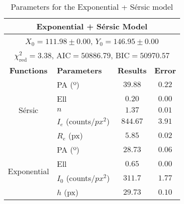 \begin{table}[!htb]
  \centering
  \begin{tabular}{|c|l|c|c|}
    \hline
    \multicolumn{4}{|c|}{\textbf{Exponential + Sérsic Model}}                                                    \\
    \hline
    \multicolumn{4}{|c|}{\(X_{0} = 111.98 \pm 0.00\), \(Y_{0} = 146.95 \pm 0.00\)}                               \\
    \hline
    \multicolumn{4}{|c|}{\(\chi^{2}_{\text{red}} = 3.38\), \(\text{AIC} = 50886.79\), \(\text{BIC} = 50970.57\)} \\
    \hline
    \textbf{Functions} & \textbf{Parameters}           & \textbf{Results} & \textbf{Error}                       \\
    \hline
    \multirow{5}{*}{Sérsic}
                       & PA (º)                        & \(39.88\)        & \(0.22\)                             \\
                       & Ell                           & \(0.20\)         & \(0.00\)                             \\
                       & \(n\)                         & \(1.37\)         & \(0.01\)                             \\
                       & \(I_{e}\) (counts/\(px^{2}\)) & \(844.67\)       & \(3.91\)                             \\
                       & \(R_{e}\) (px)                & \(5.85\)         & \(0.02\)                             \\
    \hline
    \multirow{4}{*}{Exponential}
                       & PA (º)                        & \(28.73\)        & \(0.06\)                             \\
                       & Ell                           & \(0.65\)         & \(0.00\)                             \\
                       & \(I_{0}\) (counts/\(px^{2}\)) & \(311.7\)        & \(1.77\)                             \\
                       & \(h\) (px)                    & \(29.73\)        & \(0.10\)                             \\
    \hline
  \end{tabular}
  \caption{Parameters for the Exponential + Sérsic model}
\end{table}




